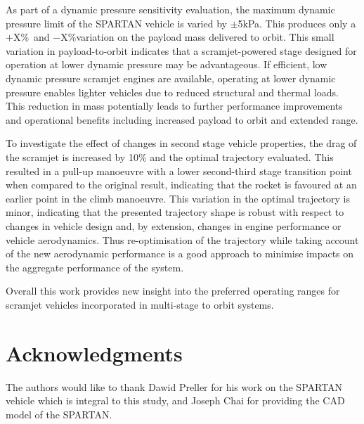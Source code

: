 \documentclass[]{aiaa-tc}
\newcommand{\qVariationPlus}{$+$X\%}
\newcommand{\qVariationMinus}{$-$X\%}
\begin{document}
As part of a dynamic pressure sensitivity evaluation, the maximum dynamic pressure limit of the SPARTAN vehicle is varied by $\pm$5kPa. This produces only a \qVariationPlus\ and \qVariationMinus \space variation on the payload mass delivered to orbit. This small variation in payload-to-orbit indicates that a scramjet-powered stage designed for operation at lower dynamic pressure may be advantageous.
If efficient, low dynamic pressure scramjet engines are available, operating at lower dynamic pressure enables lighter vehicles due to reduced structural and thermal loads. This reduction in mass potentially leads to further performance improvements and operational benefits including increased payload to orbit and extended range.
 
 To investigate the effect of changes in second stage vehicle properties, the drag of the scramjet is increased by 10\% and the optimal trajectory evaluated. This resulted in a pull-up manoeuvre with a lower second-third stage transition point when compared to the original result, indicating that the rocket is favoured at an earlier point in the climb manoeuvre. This variation in the optimal trajectory is minor, indicating that the presented trajectory shape is robust with respect to changes in vehicle design and, by extension, changes in engine performance or vehicle aerodynamics. Thus re-optimisation of the trajectory while taking account of the new aerodynamic performance is a good approach to minimise impacts on the aggregate performance of the system.

 Overall this work provides new insight into the preferred operating ranges for scramjet vehicles incorporated in multi-stage to orbit systems.

 


\section*{Acknowledgments}

The authors would like to thank Dawid Preller for his work on the SPARTAN vehicle which is integral to this study, and Joseph Chai for providing the CAD model of the SPARTAN.

\footnotesize



\end{document}
